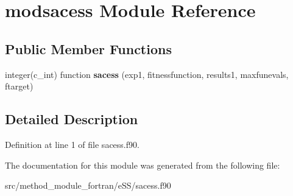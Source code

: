 \hypertarget{classmodsacess}{\section{modsacess Module Reference}
\label{classmodsacess}
}
\subsection*{Public Member Functions}
\begin{DoxyCompactItemize}
\item 
\hypertarget{classmodsacess_a9fed8bd31bd931eec7271b8adc4ba606}{integer(c\-\_\-int) function {\bfseries sacess} (exp1, fitnessfunction, results1, maxfunevals, ftarget)}\label{classmodsacess_a9fed8bd31bd931eec7271b8adc4ba606}

\end{DoxyCompactItemize}


\subsection{Detailed Description}


Definition at line 1 of file sacess.\-f90.



The documentation for this module was generated from the following file\-:\begin{DoxyCompactItemize}
\item 
src/method\-\_\-module\-\_\-fortran/e\-S\-S/sacess.\-f90\end{DoxyCompactItemize}
